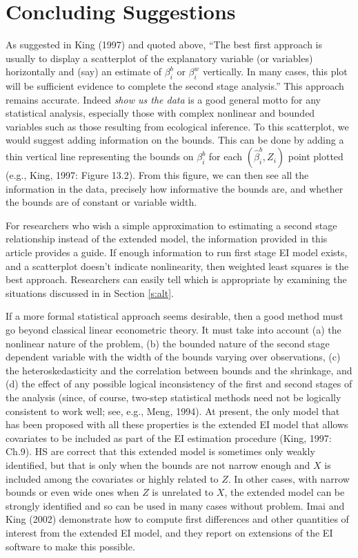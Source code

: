 \documentclass[11pt,titlepage]{article}
\begin{document}
\section{Concluding Suggestions}

As suggested in King (1997) and quoted above, ``The best first
approach is usually to display a scatterplot of the explanatory
variable (or variables) horizontally and (say) an estimate of
$\beta_i^b$ or $\beta_i^w$ vertically.  In many cases, this plot will
be sufficient evidence to complete the second stage analysis.''  This
approach remains accurate.  Indeed \emph{show us the data} is a good
general motto for any statistical analysis, especially those with
complex nonlinear and bounded variables such as those resulting from
ecological inference.  To this scatterplot, we would suggest adding
information on the bounds.  This can be done by adding a thin vertical
line representing the bounds on $\beta_i^b$ for each
$(\hat\beta_i^b,Z_i)$ point plotted (e.g., King, 1997: Figure 13.2).
From this figure, we can then see all the information in the data,
precisely how informative the bounds are, and whether the bounds are
of constant or variable width.

For researchers who wish a simple approximation to estimating a second
stage relationship instead of the extended model, the information
provided in this article provides a guide.  If enough information to
run first stage EI model exists, and a scatterplot doesn't indicate
nonlinearity, then weighted least squares is the best approach.
Researchers can easily tell which is appropriate by examining the
situations discussed in in Section \ref{s:alt}.

If a more formal statistical approach seems desirable, then a good
method must go beyond classical linear econometric theory.  It must
take into account (a) the nonlinear nature of the problem, (b) the
bounded nature of the second stage dependent variable with the width
of the bounds varying over observations, (c) the heteroskedasticity
and the correlation between bounds and the shrinkage, and (d) the
effect of any possible logical inconsistency of the first and second
stages of the analysis (since, of course, two-step statistical methods
need not be logically consistent to work well; see, e.g., Meng, 1994).
At present, the only model that has been proposed with all these
properties is the extended EI model that allows covariates to be
included as part of the EI estimation procedure (King, 1997: Ch.9).
HS are correct that this extended model is sometimes only weakly
identified, but that is only when the bounds are not narrow enough and
$X$ is included among the covariates or highly related to $Z$.  In
other cases, with narrow bounds or even wide ones when $Z$ is
unrelated to $X$, the extended model can be strongly identified and so
can be used in many cases without problem.  Imai and King (2002)
demonstrate how to compute first differences and other quantities of
interest from the extended EI model, and they report on extensions of
the EI software to make this possible.
\end{document}
